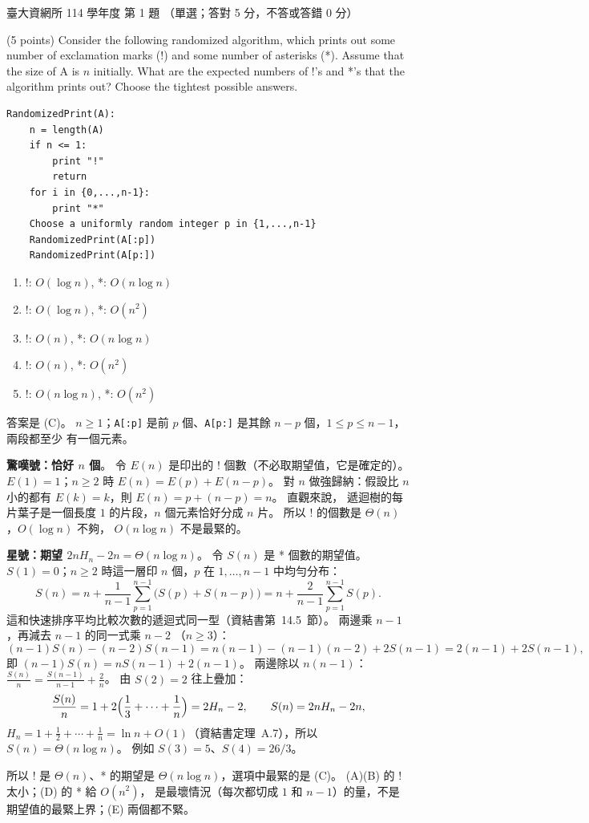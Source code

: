 \begin{pastexam}[label={px:ntu-114-dsa-01}]{臺大資網所 114 學年度 第 1 題}
（單選；答對 5 分，不答或答錯 0 分）

(5 points) Consider the following randomized algorithm, which prints out some number of exclamation marks (!)
and some number of asterisks (*). Assume that the size of A is $n$ initially. What are the expected numbers of
!'s and *'s that the algorithm prints out? Choose the tightest possible answers.
\begin{verbatim}
RandomizedPrint(A):
    n = length(A)
    if n <= 1:
        print "!"
        return
    for i in {0,...,n-1}:
        print "*"
    Choose a uniformly random integer p in {1,...,n-1}
    RandomizedPrint(A[:p])
    RandomizedPrint(A[p:])
\end{verbatim}
\begin{enumerate}[label=(\Alph*)]
\item !: $O(\log n)$, *: $O(n\log n)$
\item !: $O(\log n)$, *: $O(n^2)$
\item !: $O(n)$, *: $O(n\log n)$
\item !: $O(n)$, *: $O(n^2)$
\item !: $O(n\log n)$, *: $O(n^2)$
\end{enumerate}
\end{pastexam}

\begin{pastsoln}
答案是 (C)。 $n \ge 1$；\texttt{A[:p]} 是前 $p$ 個、\texttt{A[p:]} 是其餘 $n - p$ 個，$1 \le p \le n - 1$，兩段都至少
有一個元素。

\textbf{驚嘆號：恰好 $n$ 個}。 令 $E(n)$ 是印出的 ! 個數（不必取期望值，它是確定的）。 $E(1) = 1$；$n \ge 2$ 時
$E(n) = E(p) + E(n - p)$。 對 $n$ 做強歸納：假設比 $n$ 小的都有 $E(k) = k$，則 $E(n) = p + (n - p) = n$。 直觀來說，
遞迴樹的每片葉子是一個長度 $1$ 的片段，$n$ 個元素恰好分成 $n$ 片。 所以 ! 的個數是 $\Theta(n)$，$O(\log n)$ 不夠，
$O(n \log n)$ 不是最緊的。

\textbf{星號：期望 $2nH_n - 2n = \Theta(n \log n)$}。 令 $S(n)$ 是 * 個數的期望值。 $S(1) = 0$；$n \ge 2$ 時這一層印 $n$
個，$p$ 在 $1, \ldots, n - 1$ 中均勻分布：
\[
S(n) = n + \frac{1}{n-1}\sum_{p=1}^{n-1} \bigl(S(p) + S(n-p)\bigr) = n + \frac{2}{n-1}\sum_{p=1}^{n-1} S(p) .
\]
這和快速排序平均比較次數的遞迴式同一型（資結書第~14.5~節）。 兩邊乘 $n - 1$，再減去 $n - 1$ 的同一式乘 $n - 2$
（$n \ge 3$）：
\[
(n-1)S(n) - (n-2)S(n-1) = n(n-1) - (n-1)(n-2) + 2S(n-1) = 2(n-1) + 2S(n-1),
\]
即 $(n-1)S(n) = nS(n-1) + 2(n-1)$。 兩邊除以 $n(n-1)$：$\frac{S(n)}{n} = \frac{S(n-1)}{n-1} + \frac{2}{n}$。 由
$S(2) = 2$ 往上疊加：
\[
\frac{S(n)}{n} = 1 + 2\Bigl(\frac{1}{3} + \cdots + \frac{1}{n}\Bigr) = 2H_n - 2,
\qquad S(n) = 2nH_n - 2n ,
\]
$H_n = 1 + \frac12 + \cdots + \frac1n = \ln n + O(1)$（資結書定理~A.7），所以 $S(n) = \Theta(n \log n)$。 例如
$S(3) = 5$、$S(4) = 26/3$。

所以 ! 是 $\Theta(n)$、* 的期望是 $\Theta(n \log n)$，選項中最緊的是 (C)。 (A)(B) 的 ! 太小；(D) 的 * 給 $O(n^2)$，
是最壞情況（每次都切成 $1$ 和 $n - 1$）的量，不是期望值的最緊上界；(E) 兩個都不緊。
\end{pastsoln}
